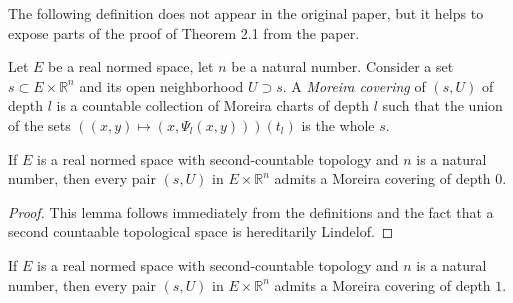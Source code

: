 The following definition does not appear in the original paper,
but it helps to expose parts of the proof of Theorem 2.1 from the paper.
\begin{definition}%
  \label{def:moreira-covering}
  Let \(E\) be a real normed space, let \(n\) be a natural number.
  Consider a set \(s\subset E \times \mathbb R^{n}\) and its open neighborhood \(U\supset s\).
  A \emph{Moreira covering} of \((s, U)\) of depth \(l\)
  is a countable collection of Moreira charts of depth \(l\)
  such that the union of the sets \(((x, y) \mapsto (x, \Psi_{l}(x, y)))(t_{l})\) is the whole \(s\).
\end{definition}

\begin{lemma}%
  \label{lem:moreira-covering-zero}
  If \(E\) is a real normed space with second-countable topology and \(n\) is a natural number,
  then every pair \((s, U)\) in \(E\times\mathbb R^{n}\)
  admits a Moreira covering of depth \(0\).
\end{lemma}

\begin{proof}
  This lemma follows immediately from the definitions
  and the fact that a second countaable topological space is hereditarily Lindelof.
\end{proof}

\begin{lemma}%
  \label{lem:moreira-covering-one}
  If \(E\) is a real normed space with second-countable topology and \(n\) is a natural number,
  then every pair \((s, U)\) in \(E\times\mathbb R^{n}\)
  admits a Moreira covering of depth \(1\).
\end{lemma}


